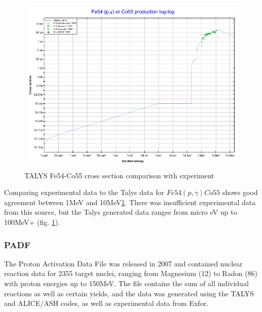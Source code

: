 \begin{figure}[tbp]
  \begin{center}
    \includegraphics[width=.6\linewidth]{chapters/background_activity/images/Fe54-Co55.png}
    \caption{TALYS Fe54-Co55 cross section comparison with experiment \cite{tendlfeco}}
    \label{fig:Fe54-Co55}
  \end{center}
\end{figure}

Comparing experimental data to the Talys data for $Fe54(p, \gamma)Co55$ shows good agreement between 1MeV and 10MeV\ref{fig:Fe54-Co55}.  There was insufficient experimental data from this source, but the Talys generated data ranges from micro eV up to 100MeV+ (fig. \ref{fig:Fe54-Co55}).


\FloatBarrier
\subsubsection{PADF}

The Proton Activation Data File was released in 2007 and contained nuclear reaction data for 2355 target nuclei, ranging from Magnesium (12) to Radon (86) with proton energies up to 150MeV.  The file contains the sum of all individual reactions as well as certain yields, and the data was generated using the TALYS and ALICE/ASH codes, as well as experimental data from Exfor\cite{exforlink}.

